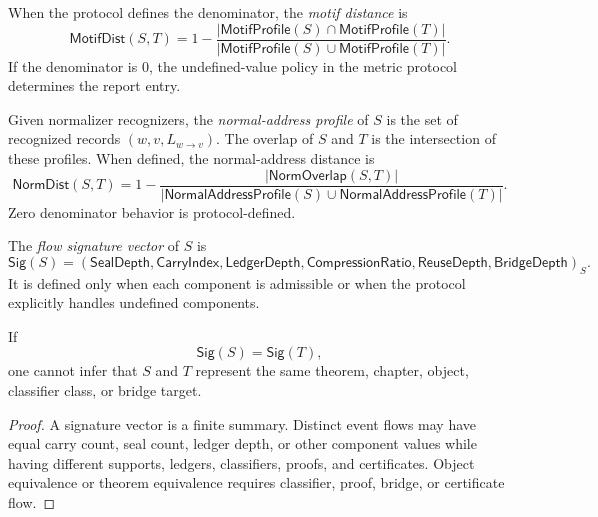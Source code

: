 \begin{definition}
\label{def:metric-report-motif-distance}
When the protocol defines the denominator, the \emph{motif distance} is
$$
  \mathsf{MotifDist}(S,T)
  =
  1-
  \frac{
    |\mathsf{MotifProfile}(S)\cap\mathsf{MotifProfile}(T)|
  }{
    |\mathsf{MotifProfile}(S)\cup\mathsf{MotifProfile}(T)|
  }.
$$
If the denominator is $0$, the undefined-value policy in the metric protocol determines the report entry.
\end{definition}

\begin{definition}
\label{def:metric-report-normal-address-distance}
Given normalizer recognizers, the \emph{normal-address profile} of $S$ is the set of recognized records $(w,v,L_{w\to v})$. The overlap of $S$ and $T$ is the intersection of these profiles. When defined, the normal-address distance is
$$
  \mathsf{NormDist}(S,T)
  =
  1-
  \frac{|\mathsf{NormOverlap}(S,T)|}
       {|\mathsf{NormalAddressProfile}(S)\cup\mathsf{NormalAddressProfile}(T)|}.
$$
Zero denominator behavior is protocol-defined.
\end{definition}

\begin{definition}
\label{def:metric-report-signature-vector}
The \emph{flow signature vector} of $S$ is
$$
  \mathsf{Sig}(S)
  =
  (
  \mathsf{SealDepth},
  \mathsf{CarryIndex},
  \mathsf{LedgerDepth},
  \mathsf{CompressionRatio},
  \mathsf{ReuseDepth},
  \mathsf{BridgeDepth}
  )_S.
$$
It is defined only when each component is admissible or when the protocol explicitly handles undefined components.
\end{definition}

\begin{theorem}
\label{thm:metric-report-signature-not-object-equality}
If
$$
  \mathsf{Sig}(S)=\mathsf{Sig}(T),
$$
one cannot infer that $S$ and $T$ represent the same theorem, chapter, object, classifier class, or bridge target.
\end{theorem}

\begin{proof}
A signature vector is a finite summary. Distinct event flows may have equal carry count, seal count, ledger depth, or other component values while having different supports, ledgers, classifiers, proofs, and certificates. Object equivalence or theorem equivalence requires classifier, proof, bridge, or certificate flow.
\end{proof}


